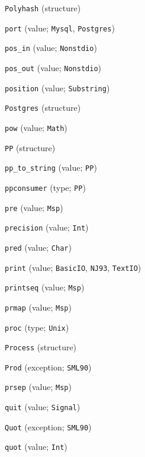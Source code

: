 \begin{description}
\item[] \verb"Polyhash" (structure)
\item[] \verb"port" (value; \verb"Mysql", \verb"Postgres")
\item[] \verb"pos_in" (value; \verb"Nonstdio")
\item[] \verb"pos_out" (value; \verb"Nonstdio")
\item[] \verb"position" (value; \verb"Substring")
\item[] \verb"Postgres" (structure)
\item[] \verb"pow" (value; \verb"Math")
\item[] \verb"PP" (structure)
\item[] \verb"pp_to_string" (value; \verb"PP")
\item[] \verb"ppconsumer" (type; \verb"PP")
\item[] \verb"pre" (value; \verb"Msp")
\item[] \verb"precision" (value; \verb"Int")
\item[] \verb"pred" (value; \verb"Char")
\item[] \verb"print" (value; \verb"BasicIO", \verb"NJ93", \verb"TextIO")
\item[] \verb"printseq" (value; \verb"Msp")
\item[] \verb"prmap" (value; \verb"Msp")
\item[] \verb"proc" (type; \verb"Unix")
\item[] \verb"Process" (structure)
\item[] \verb"Prod" (exception; \verb"SML90")
\item[] \verb"prsep" (value; \verb"Msp")
\\[2ex]

\item[] \verb"quit" (value; \verb"Signal")
\item[] \verb"Quot" (exception; \verb"SML90")
\item[] \verb"quot" (value; \verb"Int")
\\[2ex]


\end{description}
